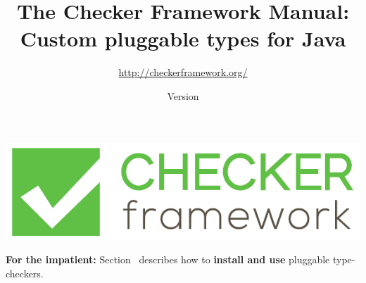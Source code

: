 \documentclass[10pt]{report}
\title{The Checker Framework Manual: \\ Custom pluggable types for Java}
\author{\url{http://checkerframework.org/}}
\date{Version \ReleaseInfo{}}
\begin{document}
\begin{center}
  \includegraphics{logo/Logo/CFLogo.pdf}
\end{center}

{\let\newpage\relax\maketitle}



\setcounter{page}{2}


\noindent
\textbf{For the impatient:}
Section~
describes how to \textbf{install and use} pluggable type-checkers.

\tableofcontents
\newpage




















% 















\htmlhr


\end{document}
